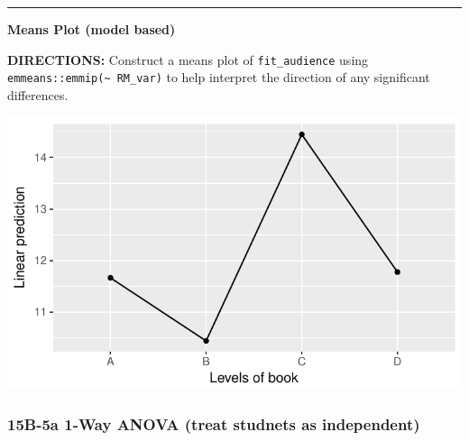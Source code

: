 \documentclass[]{article}
\newenvironment{Shaded}{\begin{snugshade}}{\end{snugshade}}
\newcommand{\KeywordTok}[1]{\textcolor[rgb]{0.13,0.29,0.53}{\textbf{#1}}}
\newcommand{\DataTypeTok}[1]{\textcolor[rgb]{0.13,0.29,0.53}{#1}}
\newcommand{\DecValTok}[1]{\textcolor[rgb]{0.00,0.00,0.81}{#1}}
\newcommand{\StringTok}[1]{\textcolor[rgb]{0.31,0.60,0.02}{#1}}
\newcommand{\OperatorTok}[1]{\textcolor[rgb]{0.81,0.36,0.00}{\textbf{#1}}}
\newcommand{\NormalTok}[1]{#1}
\begin{document}
\begin{center}\rule{0.5\linewidth}{\linethickness}\end{center}

\textbf{Means Plot (model based)}

\textbf{DIRECTIONS:} Construct a means plot of \texttt{fit\_audience}
using \texttt{emmeans::emmip(\textasciitilde{}\ RM\_var)} to help
interpret the direction of any significant differences.

\begin{Shaded}
\end{Shaded}

\begin{center}\includegraphics{Unit_5_assignment_KEY_R__spr18__files/figure-latex/unnamed-chunk-18-1} \end{center}

\clearpage

\subsubsection{15B-5a 1-Way ANOVA (treat studnets as
independent)}\label{b-5a-1-way-anova-treat-studnets-as-independent}
\end{document}
